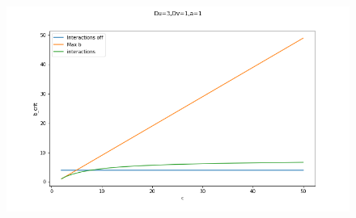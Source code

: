 \documentclass{article}
\begin{document}
\begin{figure}[H]
\includegraphics[width=\textwidth]{images/I1a} 

\end{figure}
\end{document}

